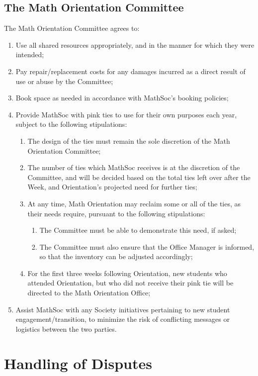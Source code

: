 \documentclass[12pt, letterpaper]{mathsoc}
\begin{document}
\subsection{The Math Orientation Committee}
The Math Orientation Committee agrees to:
\begin{enumerate}
    \item Use all shared resources appropriately, and in the manner for which they were intended;
    \item Pay repair/replacement costs for any damages incurred as a direct result of use or abuse by the Committee;
    \item Book space as needed in accordance with MathSoc’s booking policies;
    \item Provide MathSoc with pink ties to use for their own purposes each year, subject to the following stipulations:
\begin{enumerate}
    \item The design of the ties must remain the sole discretion of the Math Orientation Committee;
    \item The number of ties which MathSoc receives is at the discretion of the Committee, and will be decided based on the total ties left over after the Week, and Orientation’s projected need for further ties;
    \item At any time, Math Orientation may reclaim some or all of the ties, as their needs require, pursuant to the following stipulations: 
\begin{enumerate}
    \item The Committee must be able to demonstrate this need, if asked;
    \item The Committee must also ensure that the Office Manager is informed, so that the inventory can be adjusted accordingly;
\end{enumerate}
\item For the first three weeks following Orientation, new students who attended Orientation, but who did not receive their pink tie will be directed to the Math Orientation Office;
\end{enumerate}
\item Assist MathSoc with any Society initiatives pertaining to new student 
    engagement/transition, to minimize the risk of conflicting messages or 
    logistics between the two parties.
\end{enumerate}

\section{Handling of Disputes}
\end{document}
